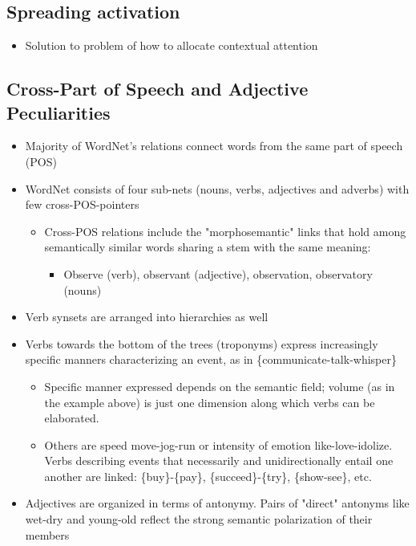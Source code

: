 \documentclass[a4paper]{article}
\begin{document}
\subsection{Spreading activation}
\begin{itemize}
    \item Solution to problem of how to allocate contextual attention
\end{itemize}

\subsection{Cross-Part of Speech and Adjective Peculiarities}
\begin{itemize}
    \item Majority of WordNet's relations connect words from the same part of speech (POS)
    \item WordNet consists of four sub-nets (nouns, verbs, adjectives and adverbs) with few cross-POS-pointers
    \begin{itemize}[label=$\circ$]
        \item Cross-POS relations include the "morphosemantic" links that hold among semantically similar words sharing a stem with the same meaning:
        \begin{itemize}[label=\tiny$\blacksquare$]
            \item Observe (verb), observant (adjective), observation, observatory (nouns)
        \end{itemize}
    \end{itemize}
    \item Verb synsets are arranged into hierarchies as well
    \item Verbs towards the bottom of the trees (troponyms) express increasingly specific manners characterizing an event, as in \{communicate-talk-whisper\}
    \begin{itemize}[label=$\circ$]
        \item Specific manner expressed depends on the semantic field; volume (as in the example above) is just one dimension along which verbs can be elaborated.
        \item Others are speed {move-jog-run} or intensity of emotion {like-love-idolize}. Verbs describing events that necessarily and unidirectionally entail one another are linked: \{buy\}-\{pay\}, \{succeed\}-\{try\}, \{show-see\}, etc.
    \end{itemize}
    \item Adjectives are organized in terms of antonymy. Pairs of "direct" antonyms like wet-dry and young-old reflect the strong semantic polarization of their members

\end{itemize}
\end{document}
